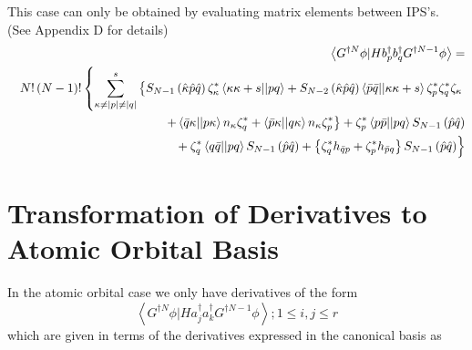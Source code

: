 \documentclass{article}
\begin{document}
This case can only be obtained by evaluating matrix elements between IPS's.
(See Appendix D for details) 
\begin{eqnarray}
&&\left\langle G^{\dagger N}\phi |Hb_{p}^{\dagger }b_{q}^{\dagger
}G^{\dagger N-1}\phi \right\rangle =  \notag \\
&&N!\left( N-1\right) !\left\{ \sum_{\kappa \neq \left| p\right| \neq \left|
q\right| }^{s}\left\{ S_{N-1}\left( \hat{\kappa}\hat{p}\hat{q}\right) \zeta
_{\kappa }^{\ast }\left\langle \kappa \kappa +s||pq\right\rangle
+S_{N-2}\left( \hat{\kappa}\hat{p}\hat{q}\right) \left\langle \bar{p}\bar{q}%
||\kappa \kappa +s\right\rangle \zeta _{p}^{\ast }\zeta _{q}^{\ast }\zeta
_{\kappa }\right. \right.  \notag \\
&&\quad \quad \quad \quad \quad \quad \quad \quad \quad \quad \left.
+\left\langle \bar{q}\kappa ||p\kappa \right\rangle n_{\kappa }\zeta
_{q}^{\ast }+\left\langle \bar{p}\kappa ||q\kappa \right\rangle n_{\kappa
}\zeta _{p}^{\ast }\right\} +\zeta _{p}^{\ast }\left\langle p\bar{p}%
||pq\right\rangle S_{N-1}\left( \hat{p}\hat{q}\right)  \notag \\
&&\quad \quad \quad \quad \quad \quad \quad \quad \quad \quad \,\left. 
\overset{}{\underset{}{}}+\zeta _{q}^{\ast }\left\langle q\bar{q}%
||pq\right\rangle S_{N-1}\left( \hat{p}\hat{q}\right) +\left\{ \zeta
_{q}^{\ast }h_{\bar{q}p}+\zeta _{p}^{\ast }h_{\bar{p}q}\right\}
S_{N-1}\left( \hat{p}\hat{q}\right) \right\}  \label{pq}
\end{eqnarray}

\section{Transformation of Derivatives to Atomic Orbital Basis}

In the atomic orbital case we only have derivatives of the form%
\begin{equation}
\left\langle G^{\dagger N}\phi |Ha_{j}^{\dagger }a_{k}^{\dagger }G^{\dagger
N-1}\phi \right\rangle ;1\leq i,j\leq r
\end{equation}
which are given in terms of the derivatives expressed in the canonical basis
as
\end{document}
